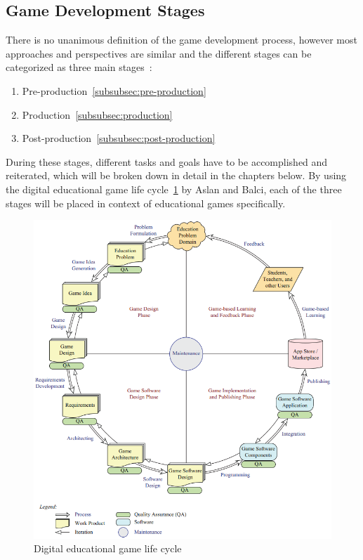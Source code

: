 \subsection{Game Development Stages}\label{subsec:game-design-stages}
There is no unanimous definition of the game development process, however most approaches and perspectives are similar and the different
stages can be categorized as three main stages~\cite{cg:game-design-stages}:
\begin{enumerate}
    \item Pre-production~\ref{subsubsec:pre-production}
    \item Production~\ref{subsubsec:production}
    \item Post-production~\ref{subsubsec:post-production}
\end{enumerate}
During these stages, different tasks and goals have to be accomplished and reiterated, which will be broken down in detail in the chapters below.
By using the digital educational game life cycle~\ref{fig:deglc} by Aslan and Balci, each of the three stages will be placed in context of
educational games specifically.
\begin{figure}
    \centering
    \includegraphics[width=\textwidth]{Pictures/res/fundamentals/deglc}
    \caption{Digital educational game life cycle~\cite{GAMED}}
    \label{fig:deglc}
\end{figure}

